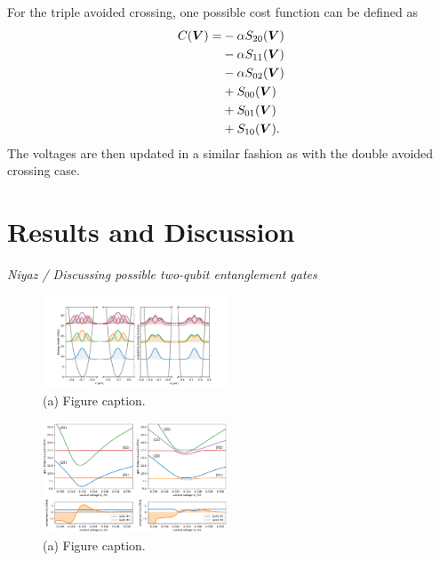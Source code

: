 \documentclass[twocolumn,superscriptaddress,unsortedaddress,
 amsmath,amssymb,
 aps,
]{revtex4-2}
\begin{document}
        For the triple avoided crossing, one possible cost function can be defined as
        \begin{align*}
            C(\boldsymbol{V}) =& -\alpha S_{20}(\boldsymbol{V}) \notag \\
            &- \alpha S_{11}(\boldsymbol{V}) \notag \\
            &- \alpha S_{02}(\boldsymbol{V}) \notag \\
            &+ S_{00}(\boldsymbol{V}) \notag \\
            &+ S_{01}(\boldsymbol{V}) \notag \\
            &+ S_{10}(\boldsymbol{V}).
        \end{align*}
        The voltages are then updated in a similar fashion as with the double avoided crossing case.
        
        
\section{Results and Discussion}\label{sec:results} %

\textit{Niyaz / Discussing possible two-qubit entanglement gates}

        
\begin{figure}
\includegraphics[width=0.49\textwidth]{figure2.pdf}
\caption{\label{fig2} (a) Figure caption.}
\end{figure}



\begin{figure}
\includegraphics[width=0.49\textwidth]{figure3.pdf}
\caption{\label{fig3} (a) Figure caption.}
\end{figure}
\end{document}
